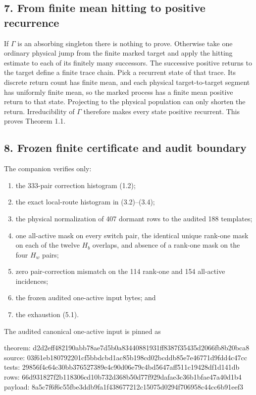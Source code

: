 \subsection{7. From finite mean hitting to positive
recurrence}

If \(\Gamma\) is an absorbing singleton there is nothing to prove.
Otherwise take one ordinary physical jump from the finite marked target
and apply the hitting estimate to each of its finitely many successors.
The successive positive returns to the target define a finite trace
chain. Pick a recurrent state of that trace. Its discrete return count
has finite mean, and each physical target-to-target segment has
uniformly finite mean, so the marked process has a finite mean positive
return to that state. Projecting to the physical population can only
shorten the return. Irreducibility of \(\Gamma\) therefore makes every
state positive recurrent. This proves Theorem 1.1.

\subsection{8. Frozen finite certificate and audit
boundary}

The companion \texttt{}
verifies only:

\begin{enumerate}
\def\labelenumi{\arabic{enumi}.}
\tightlist
\item
  the 333-pair correction histogram (1.2);
\item
  the exact local-route histogram in (3.2)--(3.4);
\item
  the physical normalization of 407 dormant rows to the audited 188
  templates;
\item
  one all-active mask on every switch pair, the identical unique
  rank-one mask on each of the twelve \(H_b\) overlaps, and absence of a
  rank-one mask on the four \(H_w\) pairs;
\item
  zero pair-correction mismatch on the 114 rank-one and 154 all-active
  incidences;
\item
  the frozen audited one-active input bytes; and
\item
  the exhaustion (5.1).
\end{enumerate}

The audited canonical one-active input is pinned as

\begin{CodeBlock}
theorem: d2d2eff482190abb78ae7d5b0a83440881931ff8387f35435d2066fb8b20bca8
source:  03f61eb180792201cf5bbdcbd1ac85b198cd02bcddb85e7e46771d9fdd4c47cc
tests:   29856f4c64c30bb376527389e4c90d06e79c4bd5647aff511c19428df1d141db
rows:    66d931827f2b118306cd10b732d368b50d77f929dafae3c36b1bfae47a40d1b4
payload: 8a5c7f6f6c55fbe3ddb9fa1f438677212c15075d0294f706958c44cc6b91eef3
\end{CodeBlock}

